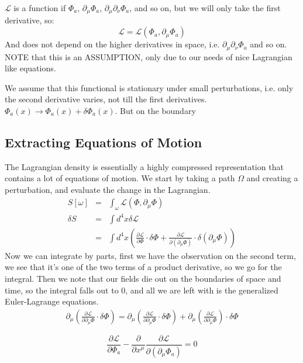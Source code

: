 $\mathcal{L}$ is a function if $\Phi_a$, $\partial_\mu \Phi_a$, $\partial_\mu \partial_\nu \Phi_a$, and so on, but we will only take the first derivative, so:
\begin{equation}
  \mathcal{L} = \mathcal{L}(\Phi_a, \partial_\mu \Phi_a)
\end{equation}
And does not depend on the higher derivatives in space, i.e. $\partial_\mu \partial_\nu \Phi_a$ and so on. NOTE that this is an ASSUMPTION, only due to our needs of nice Lagrangian like equations.

We assume that this functional is stationary under small perturbations, i.e. only the second derivative varies, not till the first derivatives. $\Phi_a(x) \longrightarrow \Phi_a(x) + \delta \Phi_a(x)$. But on the boundary 


\subsection{Extracting Equations of Motion}

The Lagrangian density is essentially a highly compressed representation that contains a lot of equations of motion.
We start by taking a path $\Omega$ and creating a perturbation, and evaluate the change in the Lagrangian.
\begin{eqnarray}
  S[\omega] &=& \int_\omega \mathcal{L}(\Phi, \partial_\mu \Phi) \\
  \delta S &=& \int d^4 x \delta \mathcal{L} \\
           &=& \int d^4x (\frac{\partial \mathcal{L}}{\partial \Phi} \cdot \delta \Phi + \frac{\partial \mathcal{L}}{\partial (\partial_\mu \Phi)} \cdot \delta(\partial_\mu \Phi))
\end{eqnarray}
Now we can integrate by parts, first we have the observation on the second term, we see that it's one of the two terms of a product derivative, so we go for the integral. Then we note that our fields die out on the boundaries of space and time, so the integral falls out to 0, and all we are left with is the generalized Euler-Lagrange equations.
\begin{eqnarray}
  \partial_\mu (\frac{\partial \mathcal{L}}{\partial \partial_\mu \Phi} \cdot \delta \Phi) = \partial_\mu (\frac{\partial \mathcal{L}}{\partial \partial_\mu \Phi} \cdot \delta \Phi) + \partial_\mu (\frac{\partial \mathcal{L}}{\partial \partial_\mu \Phi}) \cdot \delta \Phi
\end{eqnarray}


\begin{equation}
  \frac{\partial \mathcal{L}}{\partial \Phi_a} - \frac{\partial}{\partial x^\mu} \frac{\partial \mathcal{L}}{\partial (\partial_\mu \Phi_a)} = 0
\end{equation}


